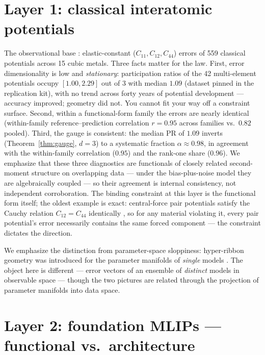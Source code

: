\documentclass[11pt]{article}
\theoremstyle{remark}
\begin{document}
\section{Layer 1: classical interatomic potentials}
\label{sec:classical}

The observational base \citep{welcing2026instance}: elastic-constant
($C_{11}, C_{12}, C_{44}$) errors of 559 classical potentials across 15 cubic
metals. Three facts matter for the law. First, error dimensionality is low and
\emph{stationary}: participation ratios of the 42 multi-element potentials
occupy $[1.00, 2.29]$ out of 3 with median $1.09$ (dataset pinned in the
replication kit), with no trend across forty years of potential development
--- accuracy improved; geometry did not. You cannot fit your way off a
constraint surface. Second, within a functional-form family the errors are
nearly identical (within-family reference--prediction correlation $r = 0.95$
across families vs.\ $0.82$ pooled). Third, the gauge is consistent: the
median PR of $1.09$ inverts (Theorem~\ref{thm:gauge}, $d{=}3$) to a systematic
fraction $\alpha \approx 0.98$, in agreement with the within-family
correlation ($0.95$) and the rank-one share ($0.96$). We emphasize that these
three diagnostics are functionals of closely related second-moment structure
on overlapping data --- under the bias-plus-noise model they are algebraically
coupled --- so their agreement is internal consistency, not independent
corroboration. The binding constraint at this layer is the functional form
itself; the oldest example is exact: central-force pair potentials satisfy
the Cauchy relation $C_{12}=C_{44}$ identically \citep{born1954}, so for any
material violating it, every pair potential's error necessarily contains the
same forced component --- the constraint dictates the direction.

We emphasize the distinction from parameter-space sloppiness: hyper-ribbon
geometry was introduced for the parameter manifolds of \emph{single} models
\citep{transtrum2011,machta2013,quinn2023,kurniawan2022}. The object here is
different --- error vectors of an ensemble of \emph{distinct} models in
observable space --- though the two pictures are related through the
projection of parameter manifolds into data space.

\section{Layer 2: foundation MLIPs --- functional vs.\ architecture}
\label{sec:mlip}
\end{document}
